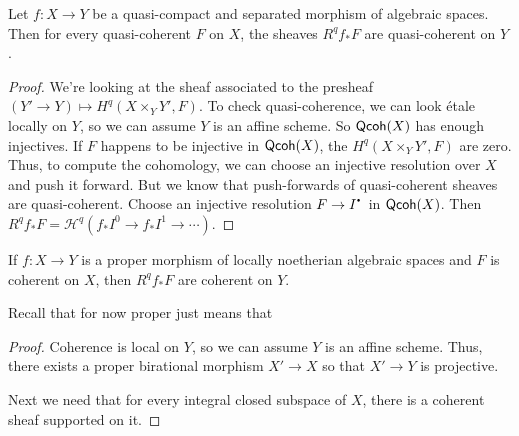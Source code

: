  \begin{lemma}
   Let $f:X\to Y$ be a quasi-compact and separated morphism of algebraic spaces. Then for
   every quasi-coherent $F$ on $X$, the sheaves $R^q\!f_*F$ are quasi-coherent on $Y$.
 \end{lemma}
 \begin{proof}
   We're looking at the sheaf associated to the presheaf $(Y'\to Y)\mapsto H^q(X\times_Y
   Y',F)$. To check quasi-coherence, we can look \'etale locally on $Y$, so we can assume
   $Y$ is an affine scheme. So $\text{\sf Qcoh}(X)$ has enough injectives. If $F$ happens to be
   injective in $\text{\sf Qcoh}(X)$, the $H^q(X\times_Y Y',F)$ are zero. Thus, to compute the
   cohomology, we can choose an injective resolution over $X$ and push it forward. But we
   know that push-forwards of quasi-coherent sheaves are quasi-coherent. Choose an
   injective resolution $F\to I^\udot$ in $\text{\sf Qcoh}(X)$. Then $R^q\!f_*F=\mathcal
   H^q(f_*I^0\to f_*I^1\to \cdots)$.
 \end{proof}
 \begin{theorem}
   If $f:X\to Y$ is a proper morphism of locally noetherian algebraic spaces and $F$ is
   coherent on $X$, then $R^q\!f_*F$ are coherent on $Y$.
 \end{theorem}
 Recall that for now proper just means that \anton{}
 \begin{proof}
   Coherence is local on $Y$, so we can assume $Y$ is an affine scheme. Thus, there
   exists a proper birational morphism $X'\to X$ so that $X'\to Y$ is projective.

   Next we need that for every integral closed subspace of $X$, there is a coherent sheaf
   supported on it.
 \end{proof}
